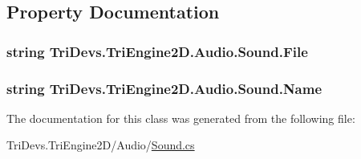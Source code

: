 \subsection{Property Documentation}
\hypertarget{class_tri_devs_1_1_tri_engine2_d_1_1_audio_1_1_sound_acdc085b638bf51a4d395b8e88281f6eb}{
\subsubsection[{File}]{\setlength{\rightskip}{0pt plus 5cm}string Tri\-Devs.\-Tri\-Engine2\-D.\-Audio.\-Sound.\-File\hspace{0.3cm}{\ttfamily [get]}}}\label{class_tri_devs_1_1_tri_engine2_d_1_1_audio_1_1_sound_acdc085b638bf51a4d395b8e88281f6eb}
\hypertarget{class_tri_devs_1_1_tri_engine2_d_1_1_audio_1_1_sound_aa229d7b8273ba4b1077ed9279d726b87}{
\subsubsection[{Name}]{\setlength{\rightskip}{0pt plus 5cm}string Tri\-Devs.\-Tri\-Engine2\-D.\-Audio.\-Sound.\-Name\hspace{0.3cm}{\ttfamily [get]}}}\label{class_tri_devs_1_1_tri_engine2_d_1_1_audio_1_1_sound_aa229d7b8273ba4b1077ed9279d726b87}


The documentation for this class was generated from the following file\-:\begin{DoxyCompactItemize}
\item 
Tri\-Devs.\-Tri\-Engine2\-D/\-Audio/\hyperlink{_sound_8cs}{Sound.\-cs}\end{DoxyCompactItemize}
